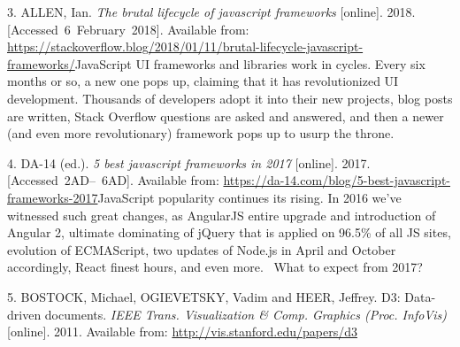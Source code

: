 \documentclass[american,a4paper,oneside,,tablecaptionabove]{scrbook}
\begin{document}
\hypertarget{ref-Allen.2018}{}
3. ALLEN, Ian. \emph{The brutal lifecycle of javascript frameworks}
{[}online{]}. 2018. {[}Accessed~6~February~2018{]}. Available from:
\url{https://stackoverflow.blog/2018/01/11/brutal-lifecycle-javascript-frameworks/}JavaScript
UI frameworks and libraries work in cycles. Every six months or so, a
new one pops up, claiming that it has revolutionized UI development.
Thousands of developers adopt it into their new projects, blog posts are
written, Stack Overflow questions are asked and answered, and then a
newer (and even more revolutionary) framework pops up to usurp the
throne.

\hypertarget{ref-DA14.2017}{}
4. DA-14 (ed.). \emph{5 best javascript frameworks in 2017}
{[}online{]}. 2017. {[}Accessed~2AD--~6AD{]}. Available from:
\url{https://da-14.com/blog/5-best-javascript-frameworks-2017}JavaScript
popularity continues its rising. In 2016 we've witnessed such great
changes, as AngularJS entire upgrade and introduction of Angular 2,
ultimate dominating of jQuery that is applied on 96.5\% of all JS sites,
evolution of ECMAScript, two updates of Node.js in April and October
accordingly, React finest hours, and even more. ~What to expect from
2017?

\hypertarget{ref-Bostock.2011}{}
5. BOSTOCK, Michael, OGIEVETSKY, Vadim and HEER, Jeffrey. D3:
Data-driven documents. \emph{IEEE Trans. Visualization \& Comp. Graphics
(Proc. InfoVis)} {[}online{]}. 2011. Available from:
\url{http://vis.stanford.edu/papers/d3}
\end{document}
